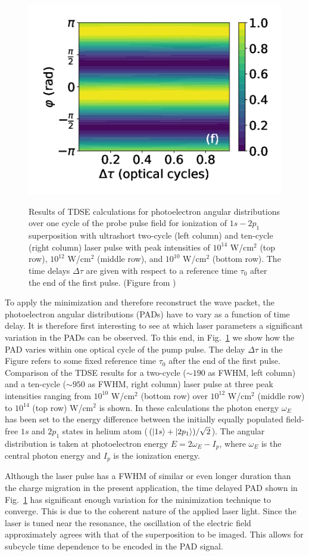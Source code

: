 \begin{figure}[!ht]
\includegraphics[width=0.4\linewidth]{figs/Photo_ionization/superpositions/Venzke_new_fig_2f.png}\\
\caption{
Results of TDSE calculations for photoelectron angular distributions over one cycle of the probe pulse field for ionization of $1s - 2p_1$ superposition with ultrashort two-cycle (left column) and ten-cycle (right column) laser pulse with peak intensities of $10^{14}$ W/cm$^2$ (top row), $10^{12}$ W/cm$^2$ (middle row), and $10^{10}$ W/cm$^2$ (bottom row). The time delays $\Delta \tau$ are given with respect to a reference time $\tau_0$ after the end of the first pulse. (Figure from \cite{venzke2021_wave})
} 
  \label{fig:pad_vs_time}
\end{figure}

To apply the minimization and therefore reconstruct the wave packet, the photoelectron angular distributions (PADs) have to vary as a function of time delay. It is therefore first interesting to see at which laser parameters a significant variation in the PADs can be observed. To this end,
in Fig.~\ref{fig:pad_vs_time} we show how the PAD varies within one optical cycle of the pump pulse.
The delay $\Delta \tau$ in the Figure refers to some fixed reference time $\tau_0$ after the end of the first pulse. Comparison of the TDSE results for a two-cycle ($\sim190$ as FWHM, left column) and a ten-cycle ($\sim950$ as FWHM, right column) laser pulse at three peak intensities ranging from $10^{10}$ W/cm$^2$ (bottom row) over $10^{12}$ W/cm$^2$ (middle row) to $10^{14}$ (top row) W/cm$^2$ is shown. In these calculations the photon energy $\omega_E$ has been set to the energy difference between the initially equally populated field-free $1s$ and $2p_1$ states in helium atom ($(\ket{1s}+\ket{2p_1})/\sqrt{2}$). The angular distribution is taken at photoelectron energy $E = 2\omega_E - I_p$, where $\omega_E$ is the central photon energy and $I_p$ is the ionization energy. 

Although the laser pulse has a FWHM of similar or even longer duration than the charge migration in the present application, the time delayed PAD shown in Fig.~\ref{fig:pad_vs_time} has significant enough variation for the minimization technique to converge. This is due to the coherent nature of the applied laser light. Since the laser is tuned near the resonance, the oscillation of the electric field approximately agrees with that of the superposition to be imaged. This allows for subcycle time dependence to be encoded in the PAD signal.

